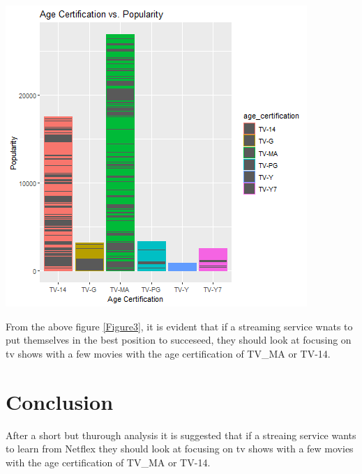 \documentclass[11pt,preprint, authoryear]{elsarticle}
\let\origfigure\figure
\let\endorigfigure\endfigure
\renewenvironment{figure}[1][2] {
    \expandafter\origfigure\expandafter[H]
} {
    \endorigfigure
}
\numberwithin{equation}{section}
\numberwithin{figure}{section}
\numberwithin{table}{section}
\begin{document}
\begin{figure}[H]

{\centering \includegraphics{Question-4_files/figure-latex/Figure 3-1} 

}

\caption{age certification \label{Figure3}}\label{fig:Figure 3}
\end{figure}

From the above figure \ref{Figure3}, it is evident that if a streaming
service wnats to put themselves in the best position to succeseed, they
should look at focusing on tv shows with a few movies with the age
certification of TV\_MA or TV-14.

\hypertarget{conclusion}{%
\section{Conclusion}\label{conclusion}}

After a short but thurough analysis it is suggested that if a streaing
service wants to learn from Netflex they should look at focusing on tv
shows with a few movies with the age certification of TV\_MA or TV-14.


\end{document}
